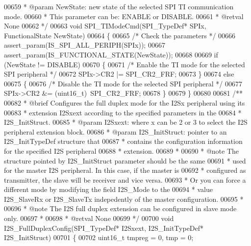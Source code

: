 \begin{DoxyCode}
00659 \textcolor{comment}{  * @param  NewState: new state of the selected SPI TI communication mode.}
00660 \textcolor{comment}{  *          This parameter can be: ENABLE or DISABLE.}
00661 \textcolor{comment}{  * @retval None}
00662 \textcolor{comment}{  */}
00663 \textcolor{keywordtype}{void} SPI_TIModeCmd(SPI\_TypeDef* SPIx, FunctionalState NewState)
00664 \{
00665   \textcolor{comment}{/* Check the parameters */}
00666   assert_param(IS\_SPI\_ALL\_PERIPH(SPIx));
00667   assert_param(IS\_FUNCTIONAL\_STATE(NewState));
00668 
00669   \textcolor{keywordflow}{if} (NewState != DISABLE)
00670   \{
00671     \textcolor{comment}{/* Enable the TI mode for the selected SPI peripheral */}
00672     SPIx->CR2 |= SPI_CR2_FRF;
00673   \}
00674   \textcolor{keywordflow}{else}
00675   \{
00676     \textcolor{comment}{/* Disable the TI mode for the selected SPI peripheral */}
00677     SPIx->CR2 &= (uint16\_t)~SPI_CR2_FRF;
00678   \}
00679 \}
00680 
00681 \textcolor{comment}{/**}
00682 \textcolor{comment}{  * @brief  Configures the full duplex mode for the I2Sx peripheral using its}
00683 \textcolor{comment}{  *         extension I2Sxext according to the specified parameters in the }
00684 \textcolor{comment}{  *         I2S\_InitStruct.}
00685 \textcolor{comment}{  * @param  I2Sxext: where x can be  2 or 3 to select the I2S peripheral extension block.}
00686 \textcolor{comment}{  * @param  I2S\_InitStruct: pointer to an I2S\_InitTypeDef structure that}
00687 \textcolor{comment}{  *         contains the configuration information for the specified I2S peripheral}
00688 \textcolor{comment}{  *         extension.}
00689 \textcolor{comment}{  * }
00690 \textcolor{comment}{  * @note   The structure pointed by I2S\_InitStruct parameter should be the same}
00691 \textcolor{comment}{  *         used for the master I2S peripheral. In this case, if the master is }
00692 \textcolor{comment}{  *         configured as transmitter, the slave will be receiver and vice versa.}
00693 \textcolor{comment}{  *         Or you can force a different mode by modifying the field I2S\_Mode to the}
00694 \textcolor{comment}{  *         value I2S\_SlaveRx or I2S\_SlaveTx indepedently of the master configuration.    }
00695 \textcolor{comment}{  *         }
00696 \textcolor{comment}{  * @note   The I2S full duplex extension can be configured in slave mode only.    }
00697 \textcolor{comment}{  *  }
00698 \textcolor{comment}{  * @retval None}
00699 \textcolor{comment}{  */}
00700 \textcolor{keywordtype}{void} I2S_FullDuplexConfig(SPI\_TypeDef* I2Sxext, I2S\_InitTypeDef* I2S\_InitStruct)
00701 \{
00702   uint16\_t tmpreg = 0, tmp = 0;

\end{DoxyCode}
